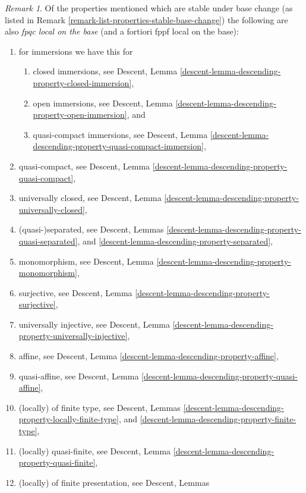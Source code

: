 \documentclass{stacks-project}
\theoremstyle{plain}
\theoremstyle{definition}
\theoremstyle{remark}
\newtheorem{remark}[subsection]{Remark}
\numberwithin{equation}{subsection}
\begin{document}
\begin{remark}
\label{remark-list-properties-fpqc-local-base}
Of the properties mentioned which are stable under base change
(as listed in Remark \ref{remark-list-properties-stable-base-change})
the following are also {\it fpqc local on the base}
(and a fortiori fppf local on the base):
\begin{enumerate}
\item for immersions we have this for
\begin{enumerate}
\item closed immersions, see
Descent, Lemma \ref{descent-lemma-descending-property-closed-immersion},
\item open immersions, see
Descent, Lemma \ref{descent-lemma-descending-property-open-immersion}, and
\item quasi-compact immersions, see
Descent,
Lemma \ref{descent-lemma-descending-property-quasi-compact-immersion},
\end{enumerate}
\item quasi-compact, see
Descent, Lemma \ref{descent-lemma-descending-property-quasi-compact},
\item universally closed, see
Descent, Lemma
\ref{descent-lemma-descending-property-universally-closed},
\item (quasi-)separated, see
Descent, Lemmas
\ref{descent-lemma-descending-property-quasi-separated}, and
\ref{descent-lemma-descending-property-separated},
\item monomorphism, see
Descent, Lemma \ref{descent-lemma-descending-property-monomorphism},
\item surjective, see
Descent, Lemma \ref{descent-lemma-descending-property-surjective},
\item universally injective, see
Descent, Lemma \ref{descent-lemma-descending-property-universally-injective},
\item affine, see
Descent, Lemma \ref{descent-lemma-descending-property-affine},
\item quasi-affine, see
Descent, Lemma \ref{descent-lemma-descending-property-quasi-affine},
\item (locally) of finite type, see
Descent,
Lemmas \ref{descent-lemma-descending-property-locally-finite-type}, and
\ref{descent-lemma-descending-property-finite-type},
\item (locally) quasi-finite, see
Descent, Lemma \ref{descent-lemma-descending-property-quasi-finite},
\item (locally) of finite presentation, see
Descent, Lemmas

\end{enumerate}
\end{remark}
\end{document}
